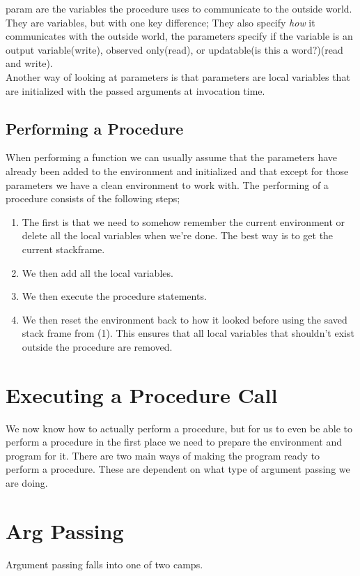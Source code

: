 \gls{param} are the variables the procedure uses to communicate to the outside world. They are variables, but with one key difference;
They also specify \textit{how} it communicates with the outside world, the parameters specify if the variable is an output variable(write), observed only(read), or updatable(is this a word?)(read and write).\\
Another way of looking at parameters is that parameters are local variables that are initialized with the passed arguments at invocation time.

\subsection{Performing a Procedure}
    When performing a function we can usually assume that the parameters have already been added to the environment and initialized and that except for those parameters we have a clean
    environment to work with.
    The performing of a procedure consists of the following steps;
    \begin{enumerate}
        \item The first is that we need to somehow remember the current environment or delete all the local variables when we're done.
            The best way is to get the current \gls{stackframe}.
        \item We then add all the local variables.
        \item We then execute the procedure statements.
        \item We then reset the environment back to how it looked before using the saved stack frame from (1). This ensures that all local variables
            that shouldn't exist outside the procedure are removed. 
    \end{enumerate}
\section{Executing a Procedure Call}
    We now know how to actually perform a procedure, but for us to even be able to perform a procedure in the first place we need to prepare the environment and program for it.
    There are two main ways of making the program ready to perform a procedure. These are dependent on what type of \gls{argument} passing we are doing.
\newpage
\section{Arg Passing}%
    Argument passing falls into one of two camps.
